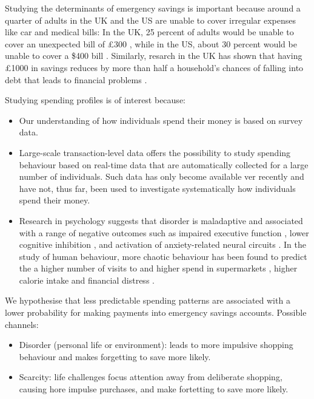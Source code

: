 Studying the determinants of emergency savings is important because around a
quarter of adults in the UK and the US are unable to cover irregular expenses
like car and medical bills: In the UK, 25 percent of adults would be unable to
cover an unexpected bill of \pounds300 \citep{philipps2021supporting}, while in
the US, about 30 percent would be unable to cover a \$400 bill
\citep{fed2022economic}. Similarly, resarch in the UK has shown that having
\pounds1000 in savings reduces by more than half a household's chances of
falling into debt that leads to financial problems
\citep{philipps2021supporting}.


Studying spending profiles is of interest because:
\begin{itemize}

    \item Our understanding of how individuals spend their money is based on survey
        data.

    \item Large-scale transaction-level data offers the possibility to study
        spending behaviour based on real-time data that are automatically
        collected for a large number of individuals. Such data has only become
        available ver recently and have not, thus far, been used to investigate
        systematically how individuals spend their money.

    \item Research in psychology suggests that disorder is maladaptive and
        associated with a range of negative outcomes such as impaired executive
        function \citep{vernon2016predictors}, lower cognitive inhibition
        \citep{mittal2015cognitive}, and activation of anxiety-related neural
        circuits \citep{hirsh2012psychological}. In the study of human
        behaviour, more chaotic behaviour has been found to predict the a
        higher number of visits to and higher spend in supermarkets
        \citep{guidotti2015behavioral}, higher calorie intake
        \citep{skatova2019those} and financial distress
        \citep{muggleton2020evidence}.

\end{itemize}


We hypothesise that less predictable spending patterns are associated with a
lower probability for making payments into emergency savings accounts. Possible
channels:
\begin{itemize}
    \item Disorder (personal life or environment): leads to more impulsive
        shopping behaviour and makes forgetting to save more likely.

    \item Scarcity: life challenges focus attention away from deliberate
        shopping, causing hore impulse purchases, and make fortetting to save
        more likely.
\end{itemize}



